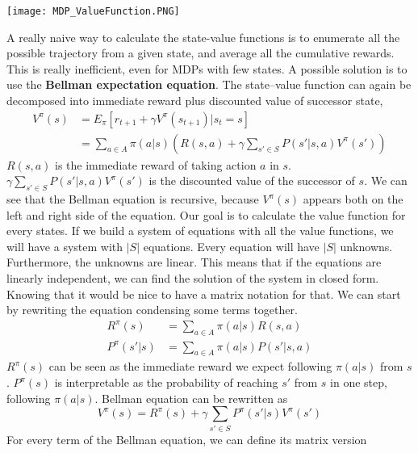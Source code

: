 \documentclass[main.tex]{subfiles}
\begin{document}
\begin{center}
    \texttt{[image: MDP\_ValueFunction.PNG]}
\end{center}
A really naive way to calculate the state-value functions is to enumerate all the possible trajectory from a given state, and average all the cumulative rewards. This is really inefficient, even for MDPs with few states. A possible solution is to use the \textbf{Bellman expectation equation}. The state–value function can again be decomposed into immediate reward plus discounted value of successor state,
\begin{align*}
    V^{\pi}(s) &= E_{\pi}[r_{t+1} + \gamma V^{\pi}(s_{t+1})|s_t=s] \\
    &= \sum_{a\in A} \pi(a|s)(R(s,a) + \gamma \sum_{s' \in S}P(s'|s,a)V^{\pi}(s'))
\end{align*}
$R(s,a)$ is the immediate reward of taking action $a$ in $s$. $\gamma \sum_{s' \in S} P(s'|s,a)V^{\pi}(s')$ is the discounted value of the successor of $s$. 
We can see that the Bellman equation is recursive, because $V^{\pi}(s)$ appears both on the left and right side of the equation\footnotemark.
Our goal is to calculate the value function for every states. If we build a system of equations with all the value functions, we will have a system with $|S|$ equations. Every equation will have $|S|$ unknowns. Furthermore, the unknowns are linear. This means that if the equations are linearly independent, we can find the solution of the system in closed form. Knowing that it would be nice to have a matrix notation for that.
We can start by rewriting the equation condensing some terms together.
\begin{align*}
    R^{\pi}(s) &= \sum_{a\in A} \pi(a|s)R(s,a) \\
    P^{\pi}(s'|s) &= \sum_{a\in A} \pi(a|s)P(s'|s,a)
\end{align*}
$R^{\pi}(s)$ can be seen as the immediate reward we expect following $\pi(a|s)$ from $s$. $P^{\pi}(s)$ is interpretable as the probability of reaching $s'$ from $s$ in one step, following $\pi(a|s)$.
Bellman equation can be rewritten as
\begin{equation*}
    V^{\pi}(s) = R^{\pi}(s) + \gamma \sum_{s' \in S} P^{\pi}(s'|s) V^{\pi}(s')
\end{equation*}
For every term of the Bellman equation, we can define its matrix version
\end{document}
